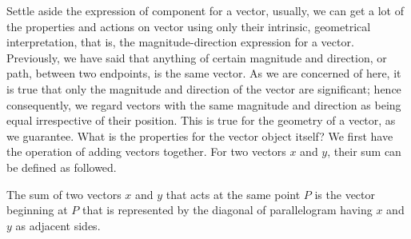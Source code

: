 Settle aside the expression of component for a vector, usually, we can get a lot of the properties and actions on vector using only their intrinsic, geometrical interpretation, that is, the magnitude-direction expression for a vector. Previously, we have said that anything of certain magnitude and direction, or path, between two endpoints, is the same vector. As we are concerned of here, it is true that only the magnitude and direction of the vector are significant; hence consequently, we regard vectors with the same magnitude and direction as being equal irrespective of their position. This is true for the geometry of a vector, as we guarantee. What is the properties for the vector object itself? We first have the operation of adding vectors together. For two vectors $x$ and $y$, their sum can be defined as followed. 
\begin{definition}
    The sum of two vectors $x$ and $y$ that acts at the same point $P$ is the vector beginning at $P$ that is represented by the diagonal of parallelogram having $x$ and $y$ as adjacent sides. 
\end{definition}

